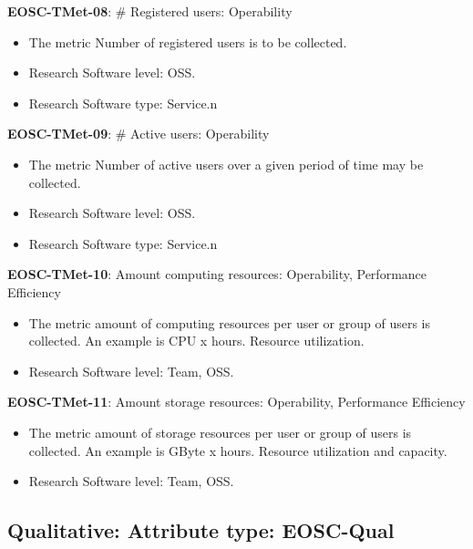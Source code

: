 \textbf{EOSC-TMet-08}: \# Registered users: Operability

\begin{itemize}
    \item The metric Number of registered users is to be collected. \cite{orviz_fernandez_eosc-synergy_2020}
    \item Research Software level: OSS.
    \item Research Software type: Service.n\end{itemize}

\textbf{EOSC-TMet-09}: \# Active users: Operability

\begin{itemize}
    \item The metric Number of active users over a given period of time may be collected. \cite{orviz_fernandez_eosc-synergy_2020}
    \item Research Software level: OSS.
    \item Research Software type: Service.n\end{itemize}

\textbf{EOSC-TMet-10}: Amount computing resources: Operability, Performance Efficiency

\begin{itemize}
    \item The metric amount of computing resources per user or group of users is collected. An example is CPU x hours. Resource utilization. \cite{iso_25010_2011_2017,orviz_fernandez_eosc-synergy_2020}
    \item Research Software level: Team, OSS.
\end{itemize}

\textbf{EOSC-TMet-11}: Amount storage resources: Operability, Performance Efficiency

\begin{itemize}
    \item The metric amount of storage resources per user or group of users is collected. An example is GByte x hours. Resource utilization and capacity. \cite{iso_25010_2011_2017,orviz_fernandez_eosc-synergy_2020}
    \item Research Software level: Team, OSS.
\end{itemize}

\subsection{Qualitative: Attribute type: EOSC-Qual}

